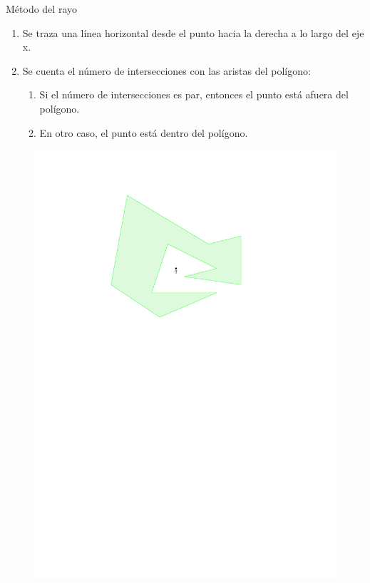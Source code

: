 \documentclass[aspectratio=169,xcolor=dvipsnames, t]{beamer}
\begin{document}
\begin{frame}[c]{Método del rayo}
  \begin{enumerate}
  \item Se traza una línea horizontal desde el punto hacia la derecha a lo largo del eje x.
  \item Se cuenta el número de intersecciones con las aristas del polígono:
    \begin{enumerate}
    \item Si el número de intersecciones es par, entonces el punto está afuera del polígono.
    \item En otro caso, el punto está dentro del polígono.
    \end{enumerate}
  \end{enumerate}
  
  \begin{figure}
    \centering
    \includegraphics[width=\linewidth, height=0.5\textheight, page=4, keepaspectratio]{IPE/pip.pdf}
  \end{figure}
\end{frame}
\end{document}
